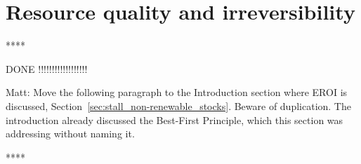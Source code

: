 %
%


\section{Resource quality and irreversibility}
\label{sec:resource_quality_and_irreversibility}



****

DONE !!!!!!!!!!!!!!!!!!

Matt: Move the following paragraph to the Introduction section
where EROI is discussed,
Section~\ref{sec:stall_non-renewable_stocks}.
Beware of duplication.
The introduction already discussed
the Best-First Principle, 
which this section was addressing 
without naming it.

****

